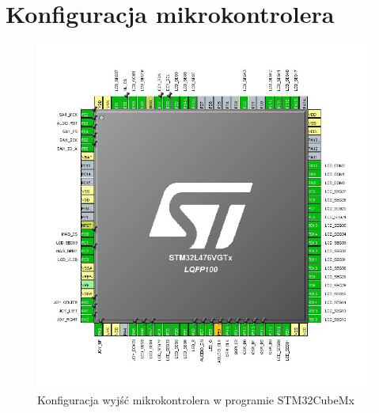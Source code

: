 \documentclass[10pt, a4paper]{article}
\begin{document}
\section{Konfiguracja mikrokontrolera}
\begin{figure}[H]
\centering
\includegraphics[width=13cm]{figures/cub.png}
\caption{Konfiguracja wyjść mikrokontrolera w programie STM32CubeMx}
\end{figure}
\newpage
\end{document}
